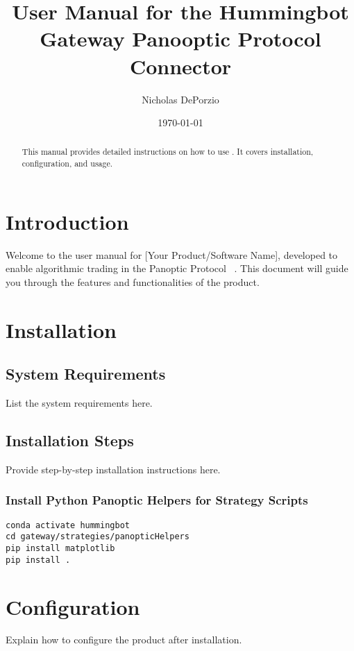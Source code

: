 \documentclass[aps,preprint]{revtex4-1}
\begin{document}
\title{User Manual for the Hummingbot Gateway Panooptic Protocol Connector}

\author{Nicholas DePorzio}

\date{\today}

\begin{abstract}
This manual provides detailed instructions on how to use . It covers installation, configuration, and usage.
\end{abstract}

\maketitle

\tableofcontents

\section{Introduction}
Welcome to the user manual for [Your Product/Software Name], developed to enable algorithmic trading in the Panoptic Protocol ~\cite{panopticXYZ}. 
This document will guide you through the features and functionalities of the product.

\section{Installation}
\subsection{System Requirements}
List the system requirements here.

\subsection{Installation Steps}
Provide step-by-step installation instructions here.

\subsubsection{Install Python Panoptic Helpers for Strategy Scripts}
\noindent 
\texttt{conda activate hummingbot}\\
\texttt{cd gateway/strategies/panopticHelpers}\\
\texttt{pip install matplotlib}\\
\texttt{pip install .}

\section{Configuration}
Explain how to configure the product after installation.
\end{document}
